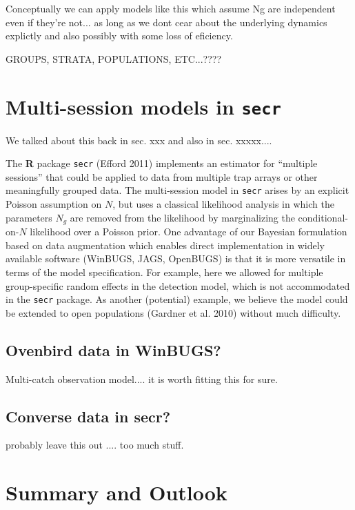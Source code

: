 Conceptually we can apply models like this which assume Ng are
independent even if they're not... as long as we dont cear about the
underlying dynamics explictly and also possibly with some loss of
eficiency. 

GROUPS, STRATA, POPULATIONS, ETC...????

\section{Multi-session models in \mbox{\tt secr}  }

We talked about this back in sec. xxx and also in sec. xxxxx....

The {\bf R} package \mbox{\tt secr} (Efford 2011) implements an
estimator for ``multiple sessions'' that could be applied to data from
multiple trap arrays or other meaningfully grouped data.
 The multi-session
model in \mbox{\tt secr} 
arises by an explicit Poisson assumption on $N$, but uses
 a classical likelihood analysis in which the parameters $N_{g}$
are removed from the likelihood by marginalizing the
conditional-on-$N$ likelihood over a Poisson prior.  One advantage of
our Bayesian formulation based on data augmentation which enables
direct implementation in widely available software (WinBUGS, JAGS,
OpenBUGS) is that it is more versatile in terms of the model
specification. For example, here we allowed for multiple
group-specific random effects in the detection model, which is not
accommodated in the \mbox{\tt secr}
package. As another (potential) example, we believe the model could be
extended to open populations (Gardner et al. 2010) without much
difficulty.

\subsection{Ovenbird data in WinBUGS?}

Multi-catch observation model.... it is worth fitting this for sure.

\subsection{Converse data in secr?}

probably leave this out .... too much stuff. 

\section{Summary and Outlook}



